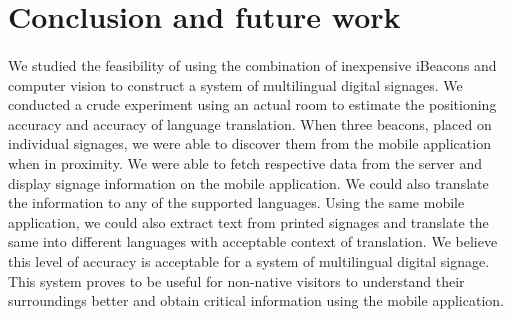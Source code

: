 \documentclass[12pt]{article}
\begin{document}
%
%
%
%
%




\section{ Conclusion and future work}
\label{sect-conclusion}
\paragraph{}We studied the feasibility of using the combination of inexpensive iBeacons and computer vision to construct a system of multilingual digital signages. We conducted a crude experiment using an actual room to estimate the positioning accuracy and accuracy of language translation. When three beacons, placed on individual signages, we were able to discover them from the mobile application when in proximity. We were able to fetch respective data from the server and display signage information on the mobile application. We could also translate the information to any of the supported languages. Using the same mobile application, we could also extract text from printed signages and translate the same into different languages with acceptable context of translation. We believe this level of accuracy is acceptable for a system of multilingual digital signage. This system proves to be useful for non-native visitors to understand their surroundings better and obtain critical information using the mobile application. 

%
\end{document}
